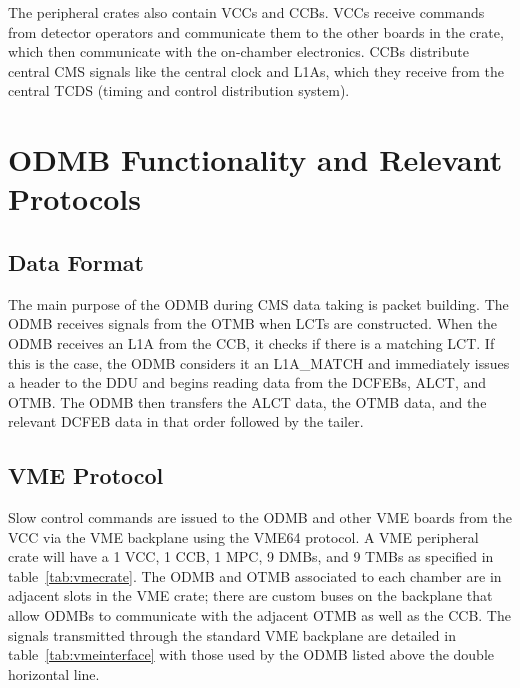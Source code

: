 \documentclass[10pt,a4paper]{article}
\begin{document}
The peripheral crates also contain VCCs and CCBs. VCCs receive commands from detector operators and communicate them to the other boards in the crate, which then communicate with the on-chamber electronics. CCBs distribute central CMS signals like the central clock and L1As, which they receive from the central TCDS (timing and control distribution system). 

\section{ODMB Functionality and Relevant Protocols}

\subsection{Data Format}

The main purpose of the ODMB during CMS data taking is packet building. The ODMB receives signals from the OTMB when LCTs are constructed. When the ODMB receives an L1A from the CCB, it checks if there is a matching LCT. If this is the case, the ODMB considers it an L1A\_MATCH and immediately issues a header to the DDU and begins reading data from the DCFEBs, ALCT, and OTMB. The ODMB then transfers the ALCT data, the OTMB data, and the relevant DCFEB data in that order followed by the tailer.

\subsection{VME Protocol}

Slow control commands are issued to the ODMB and other VME boards from the VCC via the VME backplane using the VME64 protocol. A VME peripheral crate will have a 1 VCC, 1 CCB, 1 MPC, 9 DMBs, and 9 TMBs as specified in table~\ref{tab:vmecrate}. The ODMB and OTMB associated to each chamber are in adjacent slots in the VME crate; there are custom buses on the backplane that allow ODMBs to communicate with the adjacent OTMB as well as the CCB. The signals transmitted through the standard VME backplane are detailed in table~\ref{tab:vmeinterface} with those used by the ODMB listed above the double horizontal line. 
\end{document}
